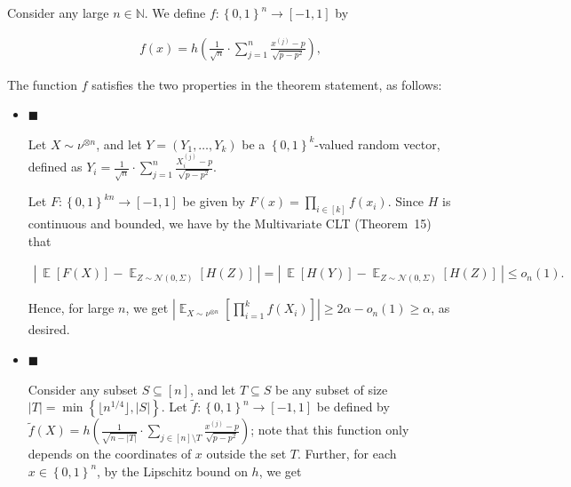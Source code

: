 \documentclass[10pt,a4paper]{article}
\begin{document}
Consider any large $n\in\mathbb{N}$.
We define $f:\left\{0,1\right\}^{n}\to[-1,1]$ by\par


\[\begin{gathered}
f(x)=h\left(\frac{1}{\sqrt{n}}\cdot\sum_{j=1}^{n}\frac{x^{\left(j\right)}-p}{\sqrt{p-p^{2}}}\right),
\end{gathered}\]


The function $f$ satisfies the two properties in the theorem statement, as follows:\par




\begin{itemize}


\item[] 
$\blacksquare$ 


Let $X\sim\nu^{\otimes n}$, and let $Y=(Y_{1},\dots,Y_{k})$ be a $\left\{0,1\right\}^{k}$-valued random vector, defined as $Y_{i}=\frac{1}{\sqrt{n}}\cdot\sum_{j=1}^{n}\frac{X_{i}^{\left(j\right)}-p}{\sqrt{p-p^{2}}}$.\par




Let $F:\left\{0,1\right\}^{kn}\to[-1,1]$ be given by $F(x)=\prod_{i\in[k]}f\left(x_{i}\right)$.
Since $H$ is continuous and bounded, we have by the Multivariate CLT (Theorem 15) that\par


\[\begin{gathered}
\left|\ \mathop{\mathbb{E}}\left[F(X)\right]-\mathop{\mathbb{E}}_{Z\sim\mathcal{N}(0,\Sigma)}\left[H(Z)\right]\ \right|=\left|\ \mathop{\mathbb{E}}\left[{H(Y)}\right]-\mathop{\mathbb{E}}_{Z\sim\mathcal{N}(0,\Sigma)}\left[H(Z)\right]\ \right|\leqslant o_{n}(1).
\end{gathered}\]


Hence, for large $n$, we get $\left|\mathop{\mathbb{E}}_{X\sim\nu^{\otimes n}}\left[\prod_{i=1}^{k}f(X_{i})\right]\right|\geqslant 2\alpha-o_{n}(1)\geqslant\alpha$, as desired.\par





\item[] 
$\blacksquare$ 


Consider any subset $S\subseteq[n]$, and let $T\subseteq S$ be any subset of size $\left|T\right|=\min\left\{\lfloor n^{1/4}\rfloor,\left|S\right|\right\}$. Let $\tilde{f}:\left\{0,1\right\}^{n}\to[-1,1]$ be defined by $\tilde{f}(X)=h\left(\frac{1}{\sqrt{n-\left|T\right|}}\cdot\sum_{j\in[n]\setminus T}\frac{x^{\left(j\right)}-p}{\sqrt{p-p^{2}}}\right)$; note that this function only depends on the coordinates of $x$ outside the set $T$. Further, for each $x\in\left\{0,1\right\}^{n}$, by the Lipschitz bound on $h$, we get\par





\end{itemize}
\end{document}
